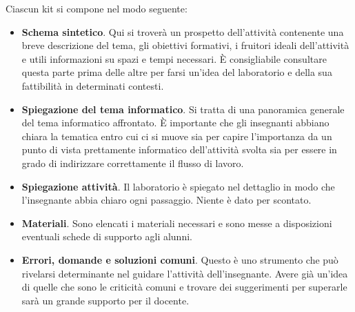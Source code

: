 \documentclass[12pt]{article}
\begin{document}
Ciascun kit si compone nel modo seguente:
\begin{itemize}
\item
\textbf{Schema sintetico}. Qui si troverà un prospetto dell'attività contenente una breve descrizione del tema, gli obiettivi formativi, i fruitori ideali dell'attività e utili informazioni su spazi e tempi necessari. È consigliabile consultare questa parte prima delle altre per farsi un'idea del laboratorio e della sua fattibilità in determinati contesti.
\item
\textbf{Spiegazione del tema informatico}. Si tratta di una panoramica generale del tema informatico affrontato. È importante che gli insegnanti abbiano chiara la tematica entro cui ci si muove sia per capire l'importanza da un punto di vista prettamente informatico dell'attività svolta sia per essere in grado di indirizzare correttamente il flusso di lavoro.
\item
\textbf{Spiegazione attività}. Il laboratorio è spiegato nel dettaglio in modo che l'insegnante abbia chiaro ogni passaggio. Niente è dato per scontato.
\item
\textbf{Materiali}. Sono elencati i materiali necessari e sono messe a disposizioni eventuali schede di supporto agli alunni.
\item
\textbf{Errori, domande e soluzioni comuni}. Questo è uno strumento che può rivelarsi determinante nel guidare l'attività dell'insegnante. Avere già un'idea di quelle che sono le criticità comuni e trovare dei suggerimenti per superarle sarà un grande supporto per il docente.
\end{itemize}
%
%
\end{document}
